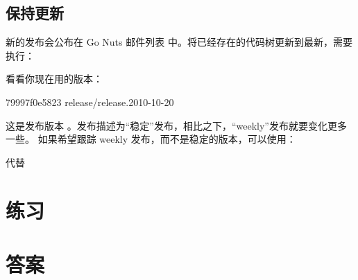\subsection{保持更新}
新的发布会公布在 Go Nuts 邮件列表 \cite{go_nuts} 中。将已经存在的代码树更新到最新，需要执行：
\begin{display}
\pr {}
\pr {}
\pr {}
\pr {}
\pr {}
\end{display}
\noindent{}看看你现在用的版本：
\begin{display}
\pr {}
\pr {}
79997f0e5823 release/release.2010-10-20
\end{display}
\noindent{}这是发布版本 。发布描述为“稳定”发布，相比之下，“weekly”发布就要变化更多一些。
如果希望跟踪 weekly 发布，而不是稳定的版本，可以使用：
\begin{display}
\pr {}
\end{display}
代替
\begin{display}
\pr {}
\end{display}

\section{练习}


\cleardoublepage
\section{答案}
\shipoutAnswer
